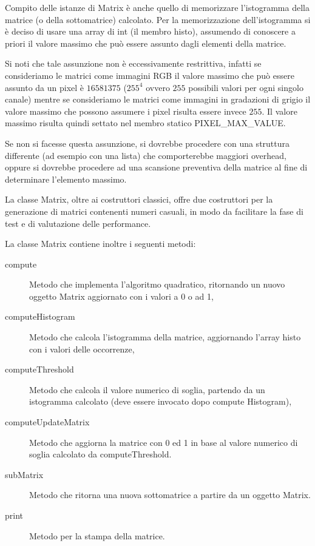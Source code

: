 \documentclass[a4paper,10pt]{article}
\begin{document}
Compito delle istanze di \textsf{Matrix} \`e anche quello di memorizzare l'istogramma della matrice (o della sottomatrice) calcolato. Per la memorizzazione dell'istogramma si \`e deciso di usare una array di int (il membro \textsf{histo}), assumendo di conoscere a priori il valore massimo che pu\`o essere assunto dagli elementi della matrice.

Si noti che tale assunzione non \`e eccessivamente restrittiva, infatti se consideriamo le matrici come immagini RGB il valore massimo che pu\`o essere assunto da un pixel \`e $16581375$ ($255^4$ ovvero $255$ possibili valori per ogni singolo canale) mentre se consideriamo le matrici come immagini in gradazioni di grigio il valore massimo che possono assumere i pixel risulta essere invece $255$. Il valore massimo risulta quindi settato nel membro statico \textsf{PIXEL\_MAX\_VALUE}.

Se non si facesse questa assunzione, si dovrebbe procedere con una struttura differente (ad esempio con una lista) che comporterebbe maggiori overhead, oppure si dovrebbe procedere ad una scansione preventiva della matrice al fine di determinare l'elemento massimo.

La classe \textsf{Matrix}, oltre ai costruttori classici, offre due costruttori per la generazione di matrici contenenti numeri casuali, in modo da facilitare la fase di test e di valutazione delle performance.

La classe \textsf{Matrix} contiene inoltre i seguenti metodi:
\begin{description}
\item[\textsf{compute}] Metodo che implementa l'algoritmo quadratico, ritornando un nuovo oggetto \textsf{Matrix} aggiornato con i valori a 0 o ad 1,
\item[\textsf{computeHistogram}] Metodo che calcola l'istogramma della matrice, aggiornando l'array \textsf{histo} con i valori delle occorrenze,
\item[\textsf{computeThreshold}] Metodo che calcola il valore numerico di soglia, partendo da un istogramma calcolato (deve essere invocato dopo \textsf{compute Histogram}),
\item[\textsf{computeUpdateMatrix}] Metodo che aggiorna la matrice con 0 ed 1 in base al valore numerico di soglia calcolato da \textsf{computeThreshold}.
\item[\textsf{subMatrix}] Metodo che ritorna una nuova sottomatrice a partire da un oggetto \textsf{Matrix}.
\item[\textsf{print}] Metodo per la stampa della matrice.
\end{description}
\end{document}
